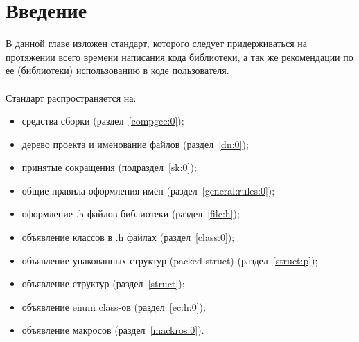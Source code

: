 \chapter{Введение}
В данной главе изложен стандарт, которого следует придерживаться на протяжении всего времени написания кода библиотеки, а так же рекомендации по ее (библиотеки) использованию в коде пользователя.\\\\
Стандарт распространяется на:
\begin{itemize}
	\item средства сборки (раздел~\ref{compgcc:0});
	\item дерево проекта и именование файлов (раздел~\ref{dn:0});
	\item принятые сокращения (подраздел~\ref{sk:0});
	\item общие правила оформления имён (раздел~\ref{general:rules:0});
	\item оформление .h файлов библиотеки (раздел~\ref{file:h});
	\item объявление классов в .h файлах (раздел~\ref{class:0});
	\item объявление упакованных структур (packed struct) (раздел~\ref{struct:p});
	\item объявление структур (раздел~\ref{struct});
	\item объявление enum class-ов (раздел~\ref{ec:h:0});
	\item объявление макросов (раздел~\ref{mackros:0}).
\end{itemize}
